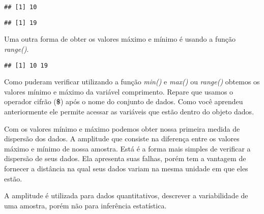 \documentclass[]{book}
\newenvironment{Shaded}{\begin{snugshade}}{\end{snugshade}}
\newcommand{\KeywordTok}[1]{\textcolor[rgb]{0.13,0.29,0.53}{\textbf{#1}}}
\newcommand{\NormalTok}[1]{#1}
\newcommand{\OperatorTok}[1]{\textcolor[rgb]{0.81,0.36,0.00}{\textbf{#1}}}
\newcommand{\StringTok}[1]{\textcolor[rgb]{0.31,0.60,0.02}{#1}}
\begin{document}
\begin{verbatim}
## [1] 10
\end{verbatim}

\begin{Shaded}
\end{Shaded}

\begin{verbatim}
## [1] 19
\end{verbatim}

Uma outra forma de obter os valores máximo e mínimo é usando a função \emph{range()}.

\begin{Shaded}
\end{Shaded}

\begin{verbatim}
## [1] 10 19
\end{verbatim}

Como puderam verificar utilizando a função \emph{min()} e \emph{max()} ou \emph{range()} obtemos os valores mínimo e máximo da variável comprimento. Repare que usamos o operador cifrão (\textbf{\$}) após o nome do conjunto de dados. Como você aprendeu anteriormente ele permite acessar as variáveis que estão dentro do objeto dados.

Com os valores mínimo e máximo podemos obter nossa primeira medida de dispersão dos dados. A amplitude que consiste na diferença entre os valores máximo e mínimo de nossa amostra. Está é a forma mais simples de verificar a dispersão de seus dados. Ela apresenta suas falhas, porém tem a vantagem de fornecer a distância na qual seus dados variam na mesma unidade em que eles estão.

A amplitude é utilizada para dados quantitativos, descrever a variabilidade de uma amostra, porém não para inferência estatística.

\begin{Shaded}
\end{Shaded}
\end{document}
